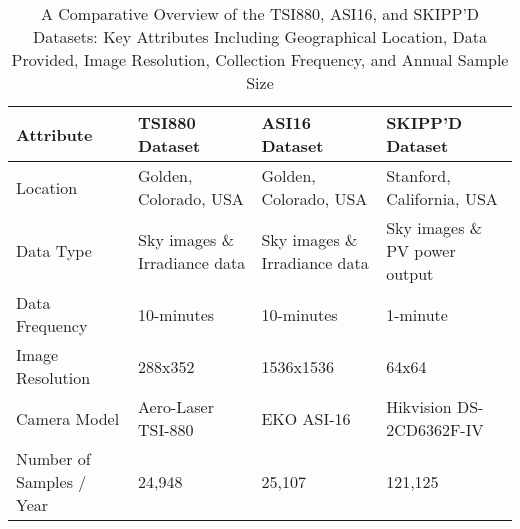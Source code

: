 \begin{table*}
  \caption{A Comparative Overview of the TSI880, ASI16, and SKIPP'D Datasets: Key Attributes Including Geographical Location, Data Provided, Image Resolution, Collection Frequency, and Annual Sample Size}
  \label{tab:dataset_comparison}
  \centering
  \renewcommand{\arraystretch}{1.2}
  \begin{tabularx}{\textwidth}{X X X X}
    \hline
    \textbf{Attribute} & \textbf{TSI880 Dataset} & \textbf{ASI16 Dataset} & \textbf{SKIPP'D Dataset} \\ 
    \hline
    Location & Golden, Colorado, USA & Golden, Colorado, USA & Stanford, California, USA \\ 
    Data Type & Sky images \& Irradiance data & Sky images \& Irradiance data & Sky images \& PV power output \\ 
    Data Frequency & 10-minutes & 10-minutes & 1-minute \\ 
    Image Resolution & 288x352 & 1536x1536 & 64x64 \\ 
    Camera Model & Aero-Laser TSI-880 & EKO ASI-16 & Hikvision DS-2CD6362F-IV \\ 
    Number of Samples / Year & 24,948 & 25,107 & 121,125 \\ 
    \hline
  \end{tabularx}
\end{table*}
